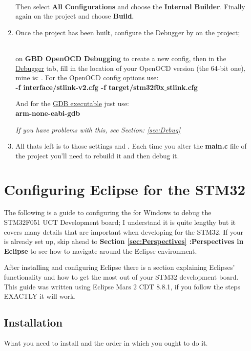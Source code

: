 \begin{enumerate}
\\
\raggedright
Then select \textbf{All Configurations} and choose the \textbf{Internal Builder}. Finally  again on the project and choose \textbf{Build}.
\item Once the project has been built, configure the Debugger by  on the project;\\
\centering {}
\\
\raggedright
{} on \textbf{GBD OpenOCD Debugging} to create a new config, then in the \underline{Debugger} tab, fill in the location of your OpenOCD version (the 64-bit one), mine is: . For the OpenOCD config options use:
\\
\centering \textbf{\color{Orange} -f interface/stlink-v2.cfg -f target/stm32f0x$\_$stlink.cfg}
\\
\raggedright
And for the \underline{GDB executable} just use:
\\
\centering \textbf{\color{Orange} arm-none-eabi-gdb}
\\
\raggedright \emph{\color{Gray} If you have problems with this, see Section: \ref{sec:Debug}}
\raggedright
\item All thats left is to  those settings and . Each time you alter the \textbf{main.c} file of the project you'll need to rebuild it and then debug it.
\end{enumerate}
\newpage
\section{Configuring Eclipse for the STM32}
\label{sec:eclipseconfig}
The following is a guide to configuring the  for Windows to debug the STM32F051 UCT Development board; I understand it is quite lengthy but it covers many details that are important when developing for the STM32. If your  is already set up, skip ahead to \textbf{Section \ref{sec:Perspectives} :Perspectives in Eclipse} to see how to navigate around the Eclipse environment.
\par
After installing and configuring Eclipse there is a section explaining Eclipses' functionality and how to get the most out of your STM32 development board. This guide was written using Eclipse Mars 2 CDT 8.8.1, if you follow the steps EXACTLY it will work.
\subsection{Installation}
What you need to install and the order in which you ought to do it.
